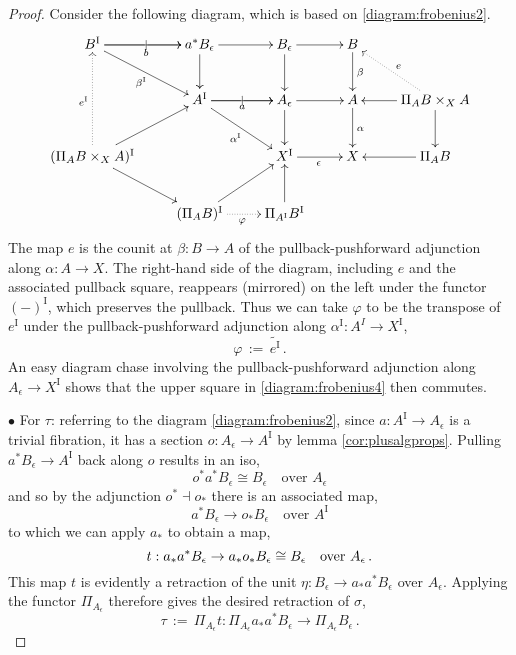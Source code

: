 \documentclass[11pt,reqno]{amsart}
\newcommand{\ra}{\ensuremath{\rightarrow}}
\newcommand{\I}{\ensuremath{\mathrm{I}}}
\theoremstyle{remark}
\theoremstyle{definition}
\begin{document}
\begin{proof}
Consider the following diagram, which is based on \eqref{diagram:frobenius2}.
\begin{equation}\label{diagram:frobenius7}
\xymatrix{
B^\I \ar[r]|| \ar[r]_{b} \ar[rd]_{\beta^\I}  & a^*B_\epsilon \ar[r]  \ar[d]  & B_{\epsilon}  \ar[d]   \ar[r] & B \ar[d]^\beta & \\
& A^\I \ar[r]|| \ar[r]_{a}  \ar[rd]_{\alpha^\I}  & A_{\epsilon} \ar[d]   \ar[r] & A \ar[d]^\alpha &  \ar[d] \ar[l] \ar@{..>}[lu]_{e}\Pi_AB\times_{X} A\\
 (\Pi_AB \times_{X} A)^\I \ar@{..>}[uu]^{e^\I} \ar[ru] \ar[rd] && X^\I \ar[r]_{\epsilon} &  X &   \Pi_AB \ar[l]\\
& (\Pi_AB)^\I \ar[ru] \ar@{..>}[r]_\varphi  & \Pi_{A^\I}B^\I   \ar[u] & &
}
\end{equation}
The map $e$ is the counit at $\beta: B\ra A$ of the pullback-pushforward adjunction along $\alpha: A\ra X$. The right-hand side of the diagram, including $e$ and the associated pullback square, reappears (mirrored) on the left under the functor $(-)^\I$, which preserves the pullback. Thus we can take $\varphi$ to be the transpose of $e^\I$ under the pullback-pushforward adjunction along $\alpha^\I: A^I\ra X^\I$,
\[
\varphi\, :=\, \widetilde{e^\I}\,.
\]
An easy diagram chase involving the pullback-pushforward adjunction along $A_\epsilon\ra X^\I$ shows that the upper square in \eqref{diagram:frobenius4} then commutes.

\smallskip

\noindent $\bullet$ For $\tau$: referring to the diagram \eqref{diagram:frobenius2}, since $a : A^\I \ra A_\epsilon$ is a trivial fibration, it has a section $o :  A_\epsilon \ra A^\I$ by lemma \ref{cor:plusalgprops}.  Pulling  $a^*B_\epsilon \ra A^\I$ back along $o$ results in an iso,
\[
o^*a^* B_\epsilon \cong B_\epsilon\quad\text{over $A_\epsilon$}
\]
and so by the adjunction $o^*\!\dashv o_*$ there is an associated map,
\[
a^* B_\epsilon \ra o_* B_\epsilon\quad\text{over $A^\I$}
\]
to which we can apply $a_*$ to obtain a map,
\[
t : a_*a^* B_\epsilon \ra a_*o_*B_\epsilon \cong B_\epsilon\quad \text{over $A_\epsilon$\,.}
\]
This map $t$ is evidently a retraction of the unit $\eta : B_\epsilon \ra a_*a^* B_\epsilon$ over $A_\epsilon$.  Applying the functor $ \Pi_{A_\epsilon}$ therefore gives the desired retraction  of $\sigma$, 
\[
\tau\, :=\, \Pi_{A_\epsilon}t :  \Pi_{A_\epsilon}a_*a^* B_\epsilon \ra \Pi_{A_\epsilon}B_\epsilon\,.
\]


\end{proof}
\end{document}
